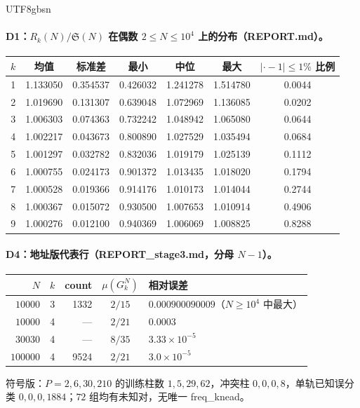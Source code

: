\documentclass[11pt,a4paper]{article}
\newcommand{\Haar}{\mu}
\newcommand{\Sing}{\mathfrak S}
\theoremstyle{plain}
\theoremstyle{definition}
\begin{document}
\begin{CJK}{UTF8}{gbsn}
\paragraph{D1：$R_k(N)/\Sing(N)$ 在偶数 $2\le N\le10^4$ 上的分布（REPORT.md）。}
\begin{center}
\small
\begin{tabular}{rcccccc}
\hline
$k$ & 均值 & 标准差 & 最小 & 中位 & 最大 & $|\cdot-1|\le1\%$ 比例\\
\hline
1 & 1.133050 & 0.354537 & 0.426032 & 1.241278 & 1.514780 & 0.0044\\
2 & 1.019690 & 0.131307 & 0.639048 & 1.072969 & 1.136085 & 0.0202\\
3 & 1.006303 & 0.074363 & 0.732242 & 1.048942 & 1.065080 & 0.0644\\
4 & 1.002217 & 0.043673 & 0.800890 & 1.027529 & 1.035494 & 0.0684\\
5 & 1.001297 & 0.032782 & 0.832036 & 1.019179 & 1.025139 & 0.1112\\
6 & 1.000755 & 0.024173 & 0.901372 & 1.013435 & 1.018020 & 0.1794\\
7 & 1.000528 & 0.019366 & 0.914176 & 1.010173 & 1.014044 & 0.2744\\
8 & 1.000367 & 0.015072 & 0.930500 & 1.007653 & 1.010914 & 0.4906\\
9 & 1.000276 & 0.012100 & 0.940369 & 1.006069 & 1.008825 & 0.8288\\
\hline
\end{tabular}
\end{center}

\paragraph{D4：地址版代表行（REPORT\_stage3.md，分母 $N-1$）。}
\begin{center}
\small
\begin{tabular}{rrrcl}
\hline
$N$ & $k$ & count & $\Haar(G_k^N)$ & 相对误差\\
\hline
$10000$ & 3 & 1332 & $2/15$ & $0.000900090009$（$N\ge10^4$ 中最大）\\
$10000$ & 4 & — & $2/21$ & $0.0003$\\
$30030$ & 4 & — & $8/35$ & $3.33\times10^{-5}$\\
$100000$ & 4 & 9524 & $2/21$ & $3.0\times10^{-5}$\\
\hline
\end{tabular}
\end{center}
符号版：$P=2,6,30,210$ 的训练柱数 $1,5,29,62$，冲突柱 $0,0,0,8$，单轨已知误分类 $0,0,0,1884$；$72$ 组均有未知对，无唯一 freq\_knead。


\end{CJK}
\end{document}
